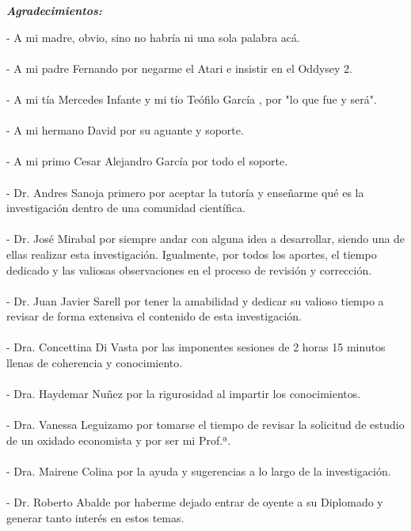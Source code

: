 \newpage
\begin{center}
\large{\textbf{\emph{\Huge{Agradecimientos:}}}}
\end{center}
\thispagestyle{empty}
\vspace*{2cm}
\thispagestyle{empty}

- A mi madre, obvio, sino no habría ni una sola palabra acá.\\\\
- A mi padre Fernando por negarme el Atari e insistir en el Oddysey 2.\\\\
- A mi tía Mercedes Infante y mi tío Teófilo García \textdagger, por "lo que fue y será".\\\\
- A mi hermano David por su aguante y soporte.\\\\
- A mi primo Cesar Alejandro García por todo el soporte.\\\\
- Dr. Andres Sanoja primero por aceptar la tutoría y enseñarme qué es la investigación dentro de una comunidad científica.\\\\
- Dr. José Mirabal por siempre andar con alguna idea a desarrollar, siendo una de ellas realizar esta investigación. Igualmente, por todos los aportes, el tiempo dedicado y las valiosas observaciones en el proceso de revisión y corrección.\\\\
- Dr. Juan Javier Sarell por tener la amabilidad y dedicar su valioso tiempo a revisar de forma extensiva el contenido de esta investigación.\\\\
- Dra. Concettina Di Vasta por las imponentes sesiones de 2 horas 15 minutos llenas de coherencia y conocimiento.\\\\
- Dra. Haydemar Nuñez por la rigurosidad al impartir los conocimientos.\\\\
- Dra. Vanessa Leguizamo por tomarse el tiempo de revisar la solicitud de estudio de un oxidado economista y por ser mi Prof.ª.\\\\
- Dra. Mairene Colina por la ayuda y sugerencias a lo largo de la investigación.\\\\
- Dr. Roberto Abalde por haberme dejado entrar de oyente a su Diplomado y generar tanto interés en estos temas.\\\\
